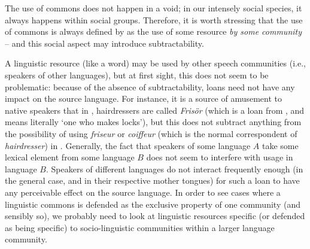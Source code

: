 \documentclass[output=paper,hidelinks]{langscibook}
\begin{document}
The use of commons does not happen in a void; in our intensely social species, it always happens within social groups. Therefore, it is worth stressing that the use of commons is always defined by \citet{ostrom90} as the use of some resource \emph{by some community} -- and this social aspect may introduce subtractability.

A linguistic resource (like a word) may be used by other speech communities (i.e., speakers of other languages), but at first sight, this does not seem to be problematic: because of the absence of subtractability, loans need not have any impact on the source language. For instance, it is a source of amusement to  native speakers that in , hairdressers are called \emph{Frisör} (which is a loan from , and means literally `one who makes locks'), but this does not subtract anything from the possibility of using \emph{friseur} or \emph{coiffeur} (which is the normal  correspondent of \textit{hairdresser}) in . Generally, the fact that speakers of some language $A$ take some lexical element from some language $B$ does not seem to interfere with usage in language $B$. Speakers of different languages do not interact frequently enough (in the general case, and in their respective mother tongues) for such a loan to have any perceivable effect on the source language. In order to see cases where a linguistic commons is defended as the exclusive property of one community (and sensibly so), we probably need to look at linguistic resources specific (or defended as being specific) to socio-linguistic communities within a larger language community.
\end{document}
